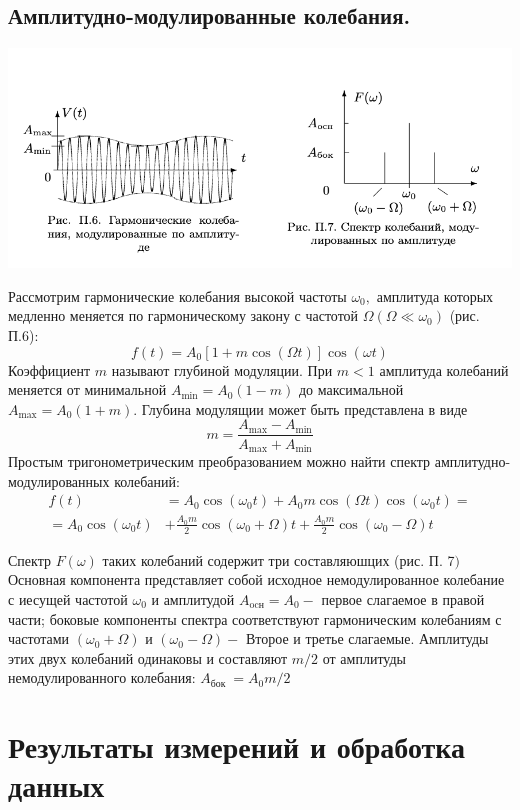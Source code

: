\subsection{Амплитудно-модулированные колебания.}

\begin{center}
\includegraphics[width=0.7\linewidth]{4.jpg}\\
\end{center}
 Рассмотрим гармонические колебания высокой частоты $\omega_{0},$ амплитуда которых медленно меняется по гармоническому закону с частотой $\Omega\left(\Omega \ll \omega_{0}\right)$ (рис. П.6):
$$
f(t)=A_{0}[1+m \cos (\Omega t)] \cos (\omega t)
$$
Коэффициент $m$ называют глубиной модуляции. При $m<1$ амплитуда колебаний меняется от минимальной $A_{\min }=A_{0}(1-m)$ до максимальной $A_{\max }=A_{0}(1+m) .$ Глубина модулящии может быть представлена в виде
$$
m=\frac{A_{\max }-A_{\min }}{A_{\max }+A_{\min }}
$$
Простым тригонометрическим преобразованием можно найти спектр амплитудно-модулированных колебаний:
$$
\begin{aligned}
f(t) &=A_{0} \cos \left(\omega_{0} t\right)+A_{0} m \cos (\Omega t) \cos \left(\omega_{0} t\right)=\\
=A_{0} \cos \left(\omega_{0} t\right) &+\frac{A_{0} m}{2} \cos \left(\omega_{0}+\Omega\right) t+\frac{A_{0} m}{2} \cos \left(\omega_{0}-\Omega\right) t
\end{aligned}
$$

Спектр $F(\omega)$ таких колебаний содержит три составляюшцих (рис. П. 7$)$ Основная компонента представляет собой исходное немодулированное колебание с иесущей частотой $\omega_{0}$ и амплитудой $A_{\mathrm{ocн}}=A_{0}-$ первое слагаемое в правой части; боковые компоненты спектра соответствуют гармоническим колебаниям с частотами $\left(\omega_{0}+\Omega\right)$ и $\left(\omega_{0}-\Omega\right)-$ Второе и третье слагаемые. Амплитуды этих двух колебаний одинаковы и составляют $m / 2$ от амплитуды немодулированного колебания: $A_{\text {бок }}=A_{0} m / 2$

\newpage

\section{Результаты измерений и обработка данных}

